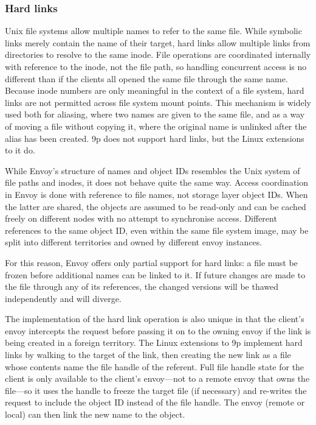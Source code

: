 \subsubsection{Hard links}\label{sec:hard-links}

Unix file systems allow multiple names to refer to the same file. While symbolic links merely contain the name of their target, hard links allow multiple links from directories to resolve to the same inode. File operations are coordinated internally with reference to the  inode, not the file path, so handling concurrent access is no different than if the clients all opened the same file through the same name. Because inode numbers are only meaningful in the context of a file system, hard links are not permitted across file system mount points. This mechanism is widely used both for aliasing, where two names are given to the same file, and as a way of moving a file without copying it, where the original name is unlinked after the alias has been created. 9p does not support hard links, but the Linux extensions to it do.

While Envoy's structure of names and object IDs resembles the Unix system of file paths and inodes, it does not behave quite the same way. Access coordination in Envoy is done with reference to file names, not storage layer object IDs. When the latter are shared, the objects are assumed to be read-only and can be cached freely on different nodes with no attempt to synchronise access. Different references to the same object ID, even within the same file system image, may be split into different territories and owned by different envoy instances.

For this reason, Envoy offers only partial support for hard links: a file must be frozen before additional names can be linked to it. If future changes are made to the file through any of its references, the changed versions will be thawed independently and will diverge.

The implementation of the hard link operation is also unique in that the client's envoy intercepts the request before passing it on to the owning envoy if the link is being created in a foreign territory. The Linux extensions to 9p implement hard links by walking to the target of the link, then creating the new link as a file whose contents name the file handle of the referent. Full file handle state for the client is only available to the client's envoy---not to a remote envoy that owns the file---so it uses the handle to freeze the target file (if necessary) and re-writes the request to include the object ID instead of the file handle. The envoy (remote or local) can then link the new name to the object.

